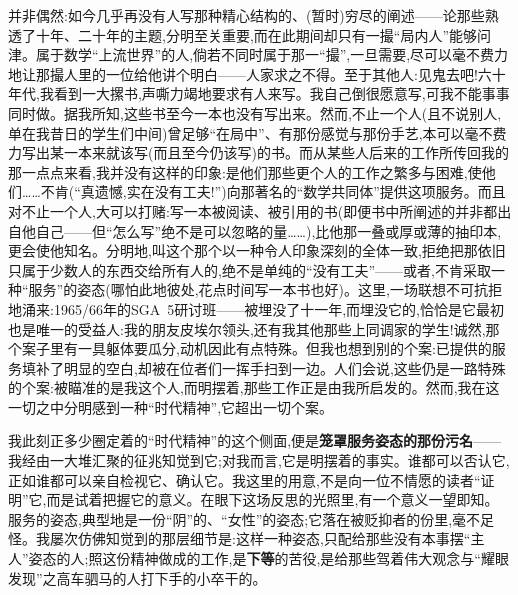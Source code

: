并非偶然:如今几乎再没有人写那种精心结构的、(暂时)穷尽的阐述——论那些熟透了十年、二十年的主题,分明至关重要,而在此期间却只有一撮“局内人”能够问津。属于数学“上流世界”的人,倘若不同时属于那一“撮”,一旦需要,尽可以毫不费力地让那撮人里的一位给他讲个明白——人家求之不得。至于其他人:见鬼去吧!六十年代,我看到一大摞书,声嘶力竭地要求有人来写。我自己倒很愿意写,可我不能事事同时做。据我所知,这些书至今一本也没有写出来。然而,不止一个人(且不说别人,单在我昔日的学生们中间)曾足够“在局中”、有那份感觉与那份手艺,本可以毫不费力写出某一本来就该写(而且至今仍该写)的书。而从某些人后来的工作所传回我的那一点点来看,我并没有这样的印象:是他们那些更个人的工作之繁多与困难,使他们……不肯(“真遗憾,实在没有工夫!”)向那著名的“数学共同体”提供这项服务。而且对不止一个人,大可以打赌:写一本被阅读、被引用的书(即便书中所阐述的并非都出自他自己——但“怎么写”绝不是可以忽略的量……),比他那一叠或厚或薄的抽印本,更会使他知名\dmark{}。分明地,叫这个那个以一种令人印象深刻的全体一致,拒绝把那依旧只属于少数人的东西交给所有人的,绝不是单纯的“没有工夫”——或者,不肯采取一种“服务”的姿态(哪怕此地彼处,花点时间写一本书也好)。这里,一场联想不可抗拒地涌来:1965/66年的SGA~5研讨班——被埋没了十一年,而埋没它的,恰恰是它最初也是唯一的受益人:我的朋友皮埃尔领头,还有我其他那些上同调家的学生!诚然,那个案子里有一具躯体要瓜分,动机因此有点特殊。但我也想到别的个案:已提供的服务填补了明显的空白,却被在位者们一挥手扫到一边。人们会说,这些仍是一路特殊的个案:被瞄准的是我这个人,而明摆着,那些工作正是由我所启发的。然而,我在这一切之中分明感到一种“时代精神”,它超出一切个案。

我此刻正多少圈定着的“时代精神”的这个侧面,便是\textbf{笼罩服务姿态的那份污名}——我经由一大堆汇聚的征兆知觉到它;对我而言,它是明摆着的事实。谁都可以否认它,正如谁都可以亲自检视它、确认它。我这里的用意,不是向一位不情愿的读者“证明”它,而是试着把握它的意义。在眼下这场反思的光照里,有一个意义一望即知。服务的姿态,典型地是一份“阴”的、“女性”的姿态;它落在被贬抑者的份里,毫不足怪。我屡次仿佛知觉到的那层细节是:这样一种姿态,只配给那些没有本事摆“主人”姿态的人;照这份精神做成的工作,是\textbf{下等}的苦役,是给那些驾着伟大观念与“耀眼发现”之高车驷马的人打下手的小卒干的\dmark{}。

